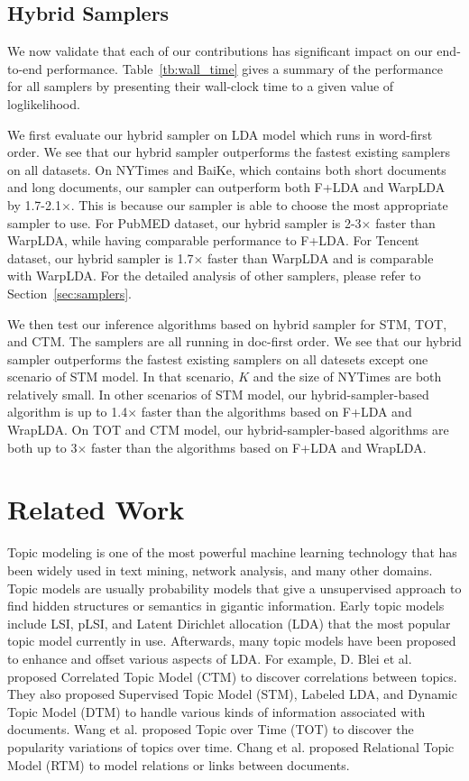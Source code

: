 \documentclass[10pt,journal,cspaper,compsoc]{IEEEtran}
\begin{document}
\subsection{Hybrid Samplers}
\label{sec:exp_hybrid_sampler}

We now validate that each of our contributions
has significant impact on our end-to-end performance.
Table~\ref{tb:wall_time} gives a summary of the
performance for all samplers by presenting their
wall-clock time to a given value of loglikelihood.

We first evaluate our hybrid sampler on LDA model which runs in word-first order. We see that our hybrid sampler outperforms
the fastest existing samplers on all datasets.
On NYTimes and BaiKe, which contains both short
documents and long documents, our sampler can outperform
both F+LDA and WarpLDA by 1.7-2.1$\times$.
This is because our sampler is able to choose
the most appropriate sampler to use.
For PubMED dataset, our hybrid sampler
is 2-3$\times$ faster than WarpLDA,
while having comparable performance to F+LDA.
For Tencent dataset, our hybrid sampler
is 1.7$\times$ faster than WarpLDA
and is comparable with WarpLDA.
For the detailed analysis of other samplers, please refer to Section~\ref{sec:samplers}.

We then test our inference algorithms based on hybrid sampler for STM, TOT, and CTM. The samplers are all running in doc-first order.
We see that our hybrid sampler outperforms the fastest existing samplers on all datesets except one scenario of STM model. In that scenario, $K$ and the size of NYTimes are both relatively small. In other scenarios of STM model, our hybrid-sampler-based algorithm is up to 1.4$\times$ faster than the algorithms based on F+LDA and WrapLDA. On TOT and CTM model, our hybrid-sampler-based algorithms are both up to 3$\times$ faster than the algorithms based on F+LDA and WrapLDA.

\section{Related Work}
Topic modeling is one of the most powerful machine
learning technology that has been widely used in
text mining, network analysis, and many other domains.
Topic models are usually probability models that 
give a unsupervised approach to find hidden structures or semantics in gigantic information. Early topic models include LSI\cite{deerwester1990indexing},  pLSI\cite{hofmann1999probabilistic}, and Latent Dirichlet allocation (LDA) that the most popular topic model currently in use. Afterwards, many topic models have been proposed to enhance and offset various aspects of LDA. For example, D. Blei et al. proposed Correlated Topic Model (CTM)\cite{blei2005correlated} to discover correlations between topics. They also proposed Supervised Topic Model (STM)\cite{mcauliffe2008supervised}, Labeled LDA\cite{ramage2009labeled}, and Dynamic Topic Model (DTM)\cite{blei2006dynamic} to handle various kinds of information associated with documents. Wang et al. proposed Topic over Time (TOT)\cite{wang2006topics} to discover the popularity variations of topics over time. Chang et al. proposed Relational Topic Model (RTM)\cite{chang2009relational} to model relations or links between documents.
\end{document}
